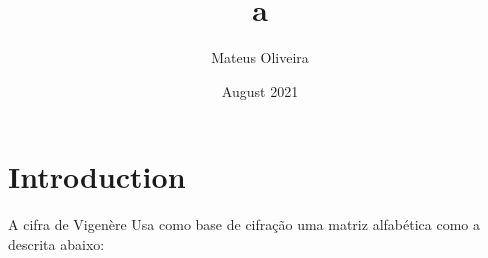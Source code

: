 \documentclass{article}
\title{a}
\author{Mateus Oliveira}
\date{August 2021}
\begin{document}
\maketitle

\section{Introduction}
A cifra de Vigenère Usa como base de cifração uma matriz alfabética como a descrita abaixo:
\end{document}
